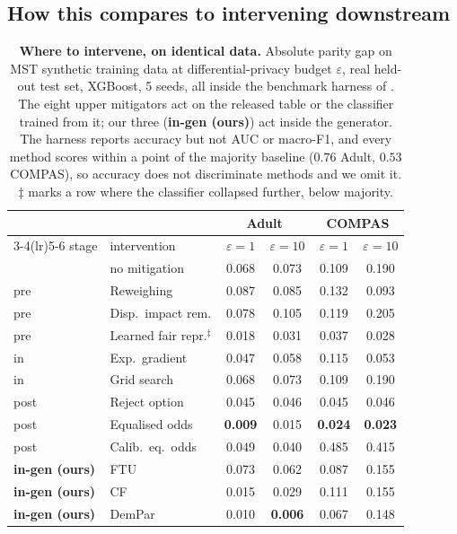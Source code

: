 \documentclass[manuscript,screen,review]{acmart}
\begin{document}
\subsection{How this compares to intervening downstream}
\label{sec:downstream}

\begin{table}[t]
\centering
\footnotesize
\setlength{\tabcolsep}{7pt}
\renewcommand{\arraystretch}{0.93}
\caption{\textbf{Where to intervene, on identical data.} Absolute parity gap
on MST synthetic training data at differential-privacy budget $\varepsilon$,
real held-out test set, XGBoost, 5 seeds, all inside the benchmark harness
of \citet{angelozzi2026where}. The eight upper mitigators act on the
released table or the classifier trained from it; our three
(\textbf{in-gen (ours)}) act inside the generator. The harness reports
accuracy but not AUC or macro-F1, and every method scores within a point of
the majority baseline ($0.76$ Adult, $0.53$ COMPAS), so accuracy does not
discriminate methods and we omit it. $\ddagger$ marks a row where the
classifier collapsed further, below majority.}
\label{tab:baselines}
\begin{tabular}{@{}ll@{\hspace{30pt}}cccc@{}}
\toprule
 & & \multicolumn{2}{c}{Adult} & \multicolumn{2}{c}{COMPAS} \\
\cmidrule(lr){3-4}\cmidrule(lr){5-6}
stage & intervention & $\varepsilon{=}1$ & $\varepsilon{=}10$ & $\varepsilon{=}1$ & $\varepsilon{=}10$ \\
\midrule
 & no mitigation                     & 0.068 & 0.073 & 0.109 & 0.190 \\
\addlinespace[2pt]
pre  & Reweighing                    & 0.087 & 0.085 & 0.132 & 0.093 \\
pre  & Disp.\ impact rem.            & 0.078 & 0.105 & 0.119 & 0.205 \\
pre  & Learned fair repr.$^\ddagger$ & 0.018 & 0.031 & 0.037 & 0.028 \\
\addlinespace[2pt]
in   & Exp.\ gradient                & 0.047 & 0.058 & 0.115 & 0.053 \\
in   & Grid search                   & 0.068 & 0.073 & 0.109 & 0.190 \\
\addlinespace[2pt]
post & Reject option                 & 0.045 & 0.046 & 0.045 & 0.046 \\
post & Equalised odds                & \textbf{0.009} & 0.015 & \textbf{0.024} & \textbf{0.023} \\
post & Calib.\ eq.\ odds             & 0.049 & 0.040 & 0.485 & 0.415 \\
\addlinespace[2pt]
\textbf{in-gen (ours)} & FTU         & 0.073 & 0.062 & 0.087 & 0.155 \\
\textbf{in-gen (ours)} & CF          & 0.015 & 0.029 & 0.111 & 0.155 \\
\textbf{in-gen (ours)} & DemPar      & 0.010 & \textbf{0.006} & 0.067 & 0.148 \\
\bottomrule
\end{tabular}
\end{table}
\end{document}
